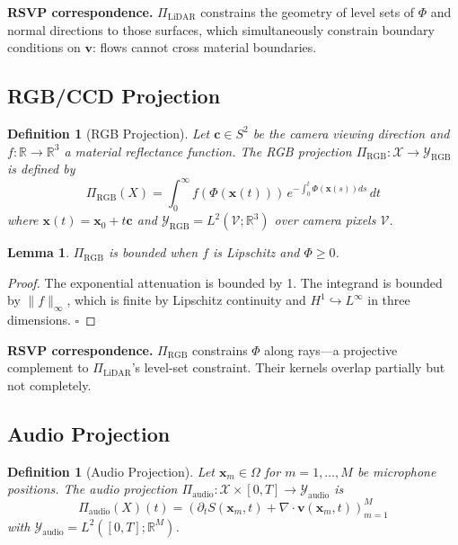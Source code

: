 \documentclass[11pt, oneside]{article}
\newtheorem{lemma}[theorem]{Lemma}
\newtheorem{definition}[theorem]{Definition}
\begin{document}
\textbf{RSVP correspondence.} $\Pi_{\mathrm{LiDAR}}$ constrains the geometry of level
sets of $\Phi$ and normal directions to those surfaces, which simultaneously constrain
boundary conditions on $\mathbf{v}$: flows cannot cross material boundaries.

\subsection{RGB/CCD Projection}

\begin{definition}[RGB Projection]
Let $\mathbf{c} \in S^2$ be the camera viewing direction and $f : \mathbb{R} \to \mathbb{R}^3$
a material reflectance function. The RGB projection
$\Pi_{\mathrm{RGB}} : \mathcal{X} \to \mathcal{Y}_{\mathrm{RGB}}$ is defined by
\[
\Pi_{\mathrm{RGB}}(X) = \int_0^\infty f(\Phi(\mathbf{x}(t)))\,
e^{-\int_0^t \Phi(\mathbf{x}(s)) ds}\, dt
\]
where $\mathbf{x}(t) = \mathbf{x}_0 + t\mathbf{c}$ and
$\mathcal{Y}_{\mathrm{RGB}} = L^2(\mathcal{V};\mathbb{R}^3)$ over camera pixels $\mathcal{V}$.
\end{definition}

\begin{lemma}
$\Pi_{\mathrm{RGB}}$ is bounded when $f$ is Lipschitz and $\Phi \ge 0$.
\end{lemma}
\begin{proof}
The exponential attenuation is bounded by 1. The integrand is bounded by $\|f\|_\infty$,
which is finite by Lipschitz continuity and $H^1 \hookrightarrow L^\infty$ in three
dimensions. $\square$
\end{proof}

\textbf{RSVP correspondence.} $\Pi_{\mathrm{RGB}}$ constrains $\Phi$ along rays---a
projective complement to $\Pi_{\mathrm{LiDAR}}$'s level-set constraint. Their kernels
overlap partially but not completely.

\subsection{Audio Projection}

\begin{definition}[Audio Projection]
Let $\mathbf{x}_m \in \Omega$ for $m = 1,\ldots,M$ be microphone positions. The audio
projection $\Pi_{\mathrm{audio}} : \mathcal{X} \times [0,T] \to \mathcal{Y}_{\mathrm{audio}}$
is
\[
\Pi_{\mathrm{audio}}(X)(t) =
\left( \partial_t S(\mathbf{x}_m, t) + \nabla \cdot \mathbf{v}(\mathbf{x}_m, t)
\right)_{m=1}^M
\]
with $\mathcal{Y}_{\mathrm{audio}} = L^2([0,T];\mathbb{R}^M)$.
\end{definition}
\end{document}
